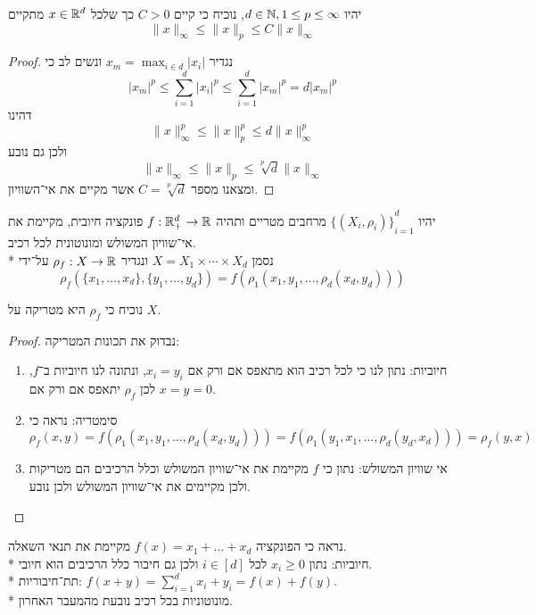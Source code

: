 \Question{}
יהיו $d \in \mathbb{N}, 1 \le p \le \infty$, נוכיח כי קיים $C > 0$ כך שלכל $x \in \mathbb{R}^d$ מתקיים
\[
	\lVert x \rVert_\infty \le \lVert x \rVert_p \le C\lVert x \rVert_\infty
\]
\begin{proof}
	נגדיר $x_m = \max_{i \in d} |x_i|$ ונשים לב כי
	\[
		{|x_m|}^p
		\le \sum_{i = 1}^{d} {|x_i|}^p
		\le \sum_{i = 1}^{d} {|x_m|}^p
		= d {|x_m|}^p
	\]
	דהינו
	\[
		\lVert x \rVert_\infty^p \le \lVert x \rVert_p^p \le d \lVert x \rVert_\infty^p
	\]
	ולכן גם נובע
	\[
		\lVert x \rVert_\infty \le \lVert x \rVert_p \le \sqrt[p]{d} \lVert x \rVert_\infty
	\]
	ומצאנו מספר $C = \sqrt[p]{d}$ אשר מקיים את אי־השוויון.
\end{proof}

\Question{}
יהיו ${\{(X_i, \rho_i)\}}_{i = 1}^d$ מרחבים מטריים ותהיה $f : \mathbb{R}_+^d \to \mathbb{R}$ פונקציה חיובית, מקיימת את אי־שוויון המשולש ומונוטונית לכל רכיב. \\*
נסמן $X = X_1 \times \cdots \times X_d$ ונגדיר $\rho_f : X \to \mathbb{R}$ על־ידי
\[
	\rho_f(\{x_1, \hdots, x_d\}, \{y_1, \hdots, y_d\}) = f(\rho_1(x_1, y_1, \hdots, \rho_d(x_d, y_d)))
\]

\Subquestion{}
נוכיח כי $\rho_f$ היא מטריקה על $X$.
\begin{proof}
	נבדוק את תכונות המטריקה:
	\begin{enumerate}
		\item חיוביות: נתון לנו כי לכל רכיב הוא מתאפס אם ורק אם $x_i = y_i$, ונתונה לנו חיוביות ב־$f$, לכן $\rho_f$ יתאפס אם ורק אם $x = y = 0$.
		\item סימטריה: נראה כי
			\[
				\rho_f(x, y)
				= f(\rho_1(x_1, y_1, \hdots, \rho_d(x_d, y_d)))
				= f(\rho_1(y_1, x_1, \hdots, \rho_d(y_d, x_d)))
				= \rho_f(y, x)
			\]
		\item אי שוויון המשולש: נתון כי $f$ מקיימת את אי־שוויון המשולש וכלל הרכיבים הם מטריקות ולכן מקיימים את אי־שוויון המשולש ולכן נובע.
	\end{enumerate}
\end{proof}

\Subquestion{}
נראה כי הפונקציה $f(x) = x_1 + \hdots + x_d$ מקיימת את תנאי השאלה. \\*
חיוביות: נתון $x_i \ge 0$ לכל $i \in [d]$ ולכן גם חיבור כלל הרכיבים הוא חיובי. \\*
תת־חיבוריות: $f(x + y) = \sum_{i = 1}^{d} x_i + y_i = f(x) + f(y)$. \\*
מונוטוניות בכל רכיב נובעת מהמעבר האחרון.

